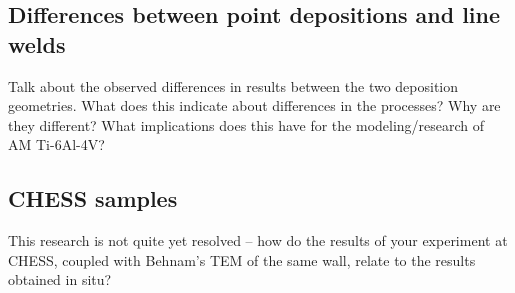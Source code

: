 \subsection{Differences between point depositions and line welds}
Talk about the observed differences in results between the two deposition geometries. What does this indicate about differences in the processes? Why are they different? What implications does this have for the modeling/research of AM Ti-6Al-4V?


\subsection{CHESS samples}
This research is not quite yet resolved -- how do the results of your experiment at CHESS, coupled with Behnam's TEM of the same wall, relate to the results obtained in situ?